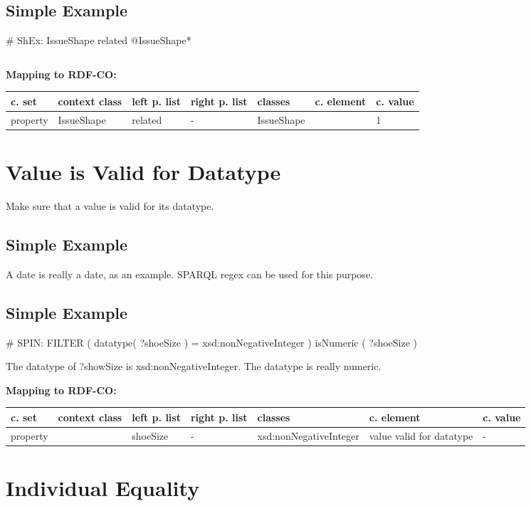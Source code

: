 \documentclass{llncs}
\newenvironment{gcotable}{
  \scriptsize
  \sffamily
  \vspace{0cm}
	\begin{center}
	\textbf{\vspace{0.4cm}Mapping to RDF-CO:} \\
  \begin{tabular}{l|l|l|l|l|l|l}
	\hline
  \textbf{c. set} & \textbf{context class} & \textbf{left p. list} & \textbf{right p. list} & \textbf{classes} & \textbf{c. element} & \textbf{c. value} \\
  \hline

}{
  \hline
  \end{tabular}
	\end{center}
}
\newenvironment{DL}{
\vspace{0cm}
	\begin{center}
  \begin{tabular}{r l}

}{
  \end{tabular}
	\end{center}
}
\begin{document}
\subsection{Simple Example}

\begin{ex}
# ShEx:
IssueShape {
    related @IssueShape*
}
\end{ex}

\begin{DL}

\end{DL}

\begin{gcotable}
property & IssueShape & related & - & IssueShape &  & 1 \\
\end{gcotable}

\section{Value is Valid for Datatype}

Make sure that a value is valid for its datatype.

\subsection{Simple Example}

A date is really a date, as an example.
SPARQL regex can be used for this purpose.

\subsection{Simple Example}

\begin{ex}
# SPIN:
FILTER ( datatype( ?shoeSize ) = xsd:nonNegativeInteger )
isNumeric ( ?shoeSize )
\end{ex}

The datatype of ?showSize is xsd:nonNegativeInteger.
The datatype is really numeric.

\begin{gcotable}
property &  & shoeSize & - & xsd:nonNegativeInteger & value valid for datatype & - \\
\end{gcotable}


\section{Individual Equality}
\end{document}
